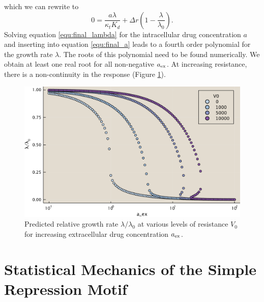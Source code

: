 which we can rewrite to
\begin{equation}
    0 = \frac{a \lambda}{\kappa_t K_d} + \Delta r\left( 1 - \frac{\lambda}{\lambda_0} \right).\label{equ:final_lambda}
\end{equation}
Solving equation \ref{equ:final_lambda} for the intracellular drug concentration $a$ and inserting into equation \ref{equ:final_a} leads to a fourth order polynomial for the growth rate $\lambda$. The roots of this polynomial need to be found numerically. We obtain at least one real root for all non-negative $a_{\mathrm{ex}}$. At increasing resistance, there is a non-continuity in the response (Figure \ref{fig:model_res}).

\begin{figure}
    \centering
    \includegraphics[width=.7\linewidth]{res_model_edit.pdf}
    \caption{Predicted relative growth rate $\lambda/\lambda_0$ at various levels of resistance $V_0$ for increasing extracellular drug concentration $a_{\mathrm{ex}}$.}
    \label{fig:model_res}
\end{figure}
\section{Statistical Mechanics of the Simple Repression Motif}
\label{sec:gene_expression}
